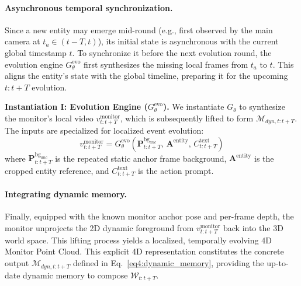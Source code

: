 \vspace{-2mm}
\paragraph{Asynchronous temporal synchronization.} Since a new entity may emerge mid-round (e.g., first observed by the main camera at $t_a \in (t-T, t)$), its initial state is asynchronous with the current global timestamp $t$. To synchronize it before the next evolution round, the evolution engine $G_{\theta}^{\text{evo}}$ first synthesizes the missing local frames from $t_a$ to $t$. This aligns the entity's state with the global timeline, preparing it for the upcoming $t:t+T$ evolution.


\begin{tcolorbox}[width=1.0\linewidth, colframe=blackish, colback=lightgraybg, boxsep=0mm, arc=1mm, left=1mm, right=1mm, top=1mm, bottom=1mm]
\textbf{Instantiation I: Evolution Engine ($G_{\theta}^{\text{evo}}$).} We instantiate $G_{\theta}$ to synthesize the monitor's local video $v_{t:t+T}^{\text{monitor}}$, which is subsequently lifted to form $\mathcal{M}_{dyn, t:t+T}$. The inputs are specialized for localized event evolution:
\begin{equation}
    v_{t:t+T}^{\text{monitor}} = G_{\theta}^{\text{evo}}(\mathbf{P}^{\text{bg}_{anc}}_{t:t+T},\, \mathbf{A}^{\text{entity}},\, C_{t:t+T}^{\text{text}})
\end{equation}
where $\mathbf{P}^{\text{bg}_{anc}}_{t:t+T}$ is the repeated static anchor frame background, $\mathbf{A}^{\text{entity}}$ is the cropped entity reference, and $C_{t:t+T}^{\text{text}}$ is the action prompt.
\end{tcolorbox}

\vspace{-2.5mm}
\paragraph{Integrating dynamic memory.} Finally, equipped with the known monitor anchor pose and per-frame depth, the monitor unprojects the 2D dynamic foreground from $v_{t:t+T}^{\text{monitor}}$ back into the 3D world space. This lifting process yields a localized, temporally evolving 4D Monitor Point Cloud. This explicit 4D representation constitutes the concrete output $\mathcal{M}_{dyn, t:t+T}$ defined in Eq.~\ref{eq4:dynamic_memory}, providing the up-to-date dynamic memory to compose $\mathcal{W}_{t:t+T}$.

\vspace{-3mm}
